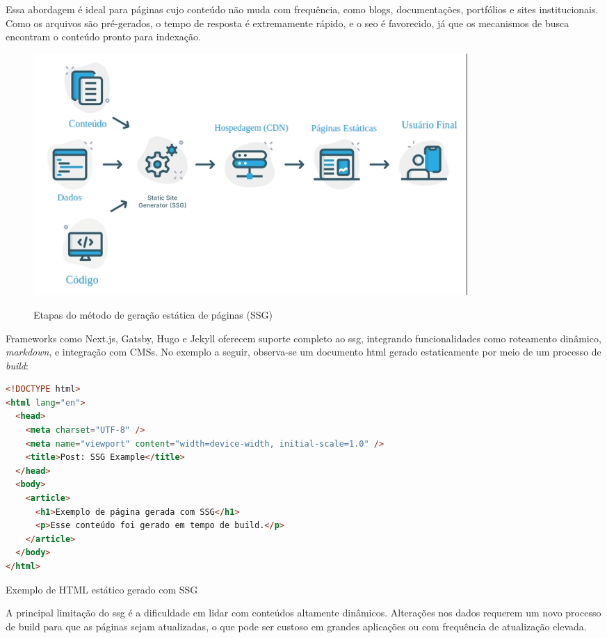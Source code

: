 Essa abordagem é ideal para páginas cujo conteúdo não muda com frequência, como blogs, documentações, portfólios e sites institucionais. Como os arquivos são pré-gerados, o tempo de resposta é extremamente rápido, e o \acrshort{seo} é favorecido, já que os mecanismos de busca encontram o conteúdo pronto para indexação.

\begin{figure}[H]
  \centering
  \caption{Etapas do método de geração estática de páginas (SSG)}
  \includegraphics[width=0.8\textwidth]{media/static_site_generation.png}
  \label{fig:ssg}
\end{figure}

Frameworks como Next.js, Gatsby, Hugo e Jekyll oferecem suporte completo ao \acrshort{ssg}, integrando funcionalidades como roteamento dinâmico, \emph{markdown}, e integração com CMSs. No exemplo a seguir, observa-se um documento \acrshort{html} gerado estaticamente por meio de um processo de \emph{build}:

\begin{codigo}[H]
  \begin{lstlisting}[language=html]
<!DOCTYPE html>
<html lang="en">
  <head>
    <meta charset="UTF-8" />
    <meta name="viewport" content="width=device-width, initial-scale=1.0" />
    <title>Post: SSG Example</title>
  </head>
  <body>
    <article>
      <h1>Exemplo de página gerada com SSG</h1>
      <p>Esse conteúdo foi gerado em tempo de build.</p>
    </article>
  </body>
</html>
  \end{lstlisting}
  \caption{Exemplo de HTML estático gerado com SSG}
  \label{cod:ssg_example}
\end{codigo}

A principal limitação do \acrshort{ssg} é a dificuldade em lidar com conteúdos altamente dinâmicos. Alterações nos dados requerem um novo processo de build para que as páginas sejam atualizadas, o que pode ser custoso em grandes aplicações ou com frequência de atualização elevada.

